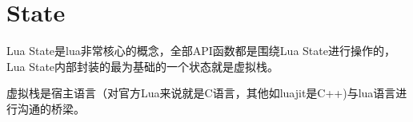\chapter{State}

Lua State是lua非常核心的概念，全部API函数都是围绕Lua State进行操作的，Lua State内部封装的最为基础的一个状态就是虚拟栈。

虚拟栈是宿主语言（对官方Lua来说就是C语言，其他如luajit是C++)与lua语言进行沟通的桥梁。